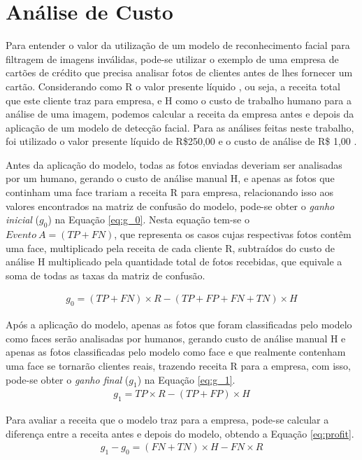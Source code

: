 \section{Análise de Custo}

Para entender o valor da utilização de um modelo de reconhecimento facial para filtragem de imagens inválidas, pode-se utilizar o exemplo de uma empresa de cartões de crédito que precisa analisar fotos de clientes antes de lhes fornecer um cartão. Considerando como R o valor presente líquido \cite{npv-article}, ou seja, a receita total que este cliente traz para empresa, e H como o custo de trabalho humano para a análise de uma imagem, podemos calcular a receita da empresa antes e depois da aplicação de um modelo de detecção facial. Para as análises feitas neste trabalho, foi utilizado o valor presente líquido de R\$250,00 e o custo de análise de R\$ 1,00 \cite{hussain2007valuationnpv}.

Antes da aplicação do modelo, todas as fotos enviadas deveriam ser analisadas por um humano, gerando o custo de análise manual H, e apenas as fotos que continham uma face trariam a receita R para empresa, relacionando isso aos valores encontrados na matriz de confusão do modelo, pode-se obter o \textit{ganho inicial} ($g_0$) na Equação \eqref{eq:g_0}. Nesta equação tem-se o $Evento\:A = (TP + FN)$, que representa os casos cujas respectivas fotos contêm uma face, multiplicado pela receita de cada cliente R, subtraídos do custo de análise H multiplicado pela quantidade total de fotos recebidas, que equivale a soma de todas as taxas da matriz de confusão.

\begin{align} \label{eq:g_0}
    g_0 = (TP+FN) \times R - (TP+FP+FN+TN) \times H
\end{align}

Após a aplicação do modelo, apenas as fotos que foram classificadas pelo modelo como faces serão analisadas por humanos, gerando custo de análise manual H e apenas as fotos classificadas pelo modelo como face e que realmente contenham uma face se tornarão clientes reais, trazendo receita R para a empresa, com isso, pode-se obter o \textit{ganho final} ($g_1$) na Equação \eqref{eq:g_1}.
\begin{align} \label{eq:g_1}
    g_1 = TP \times R - (TP+FP) \times H
\end{align}

Para avaliar a receita que o modelo traz para a empresa, pode-se calcular a diferença entre a receita antes e depois do modelo, obtendo a Equação \eqref{eq:profit}.
\begin{align} \label{eq:profit}
    g_1 - g_0 = (FN + TN) \times H - FN \times R
\end{align}

